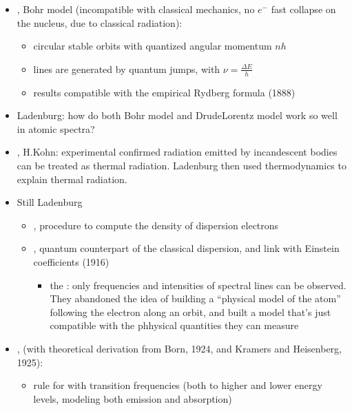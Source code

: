 \documentclass[letterpaper,10pt,english]{jupyterBook}
\begin{document}
\begin{itemize}
\begin{itemize}
\item {} 
, Bohr model (incompatible with classical mechanics, no \(e^-\) fast collapse on the nucleus, due to classical radiation):
\begin{itemize}
\item {} 
\sphinxAtStartPar
circular stable orbits with quantized angular momentum \(n h\)

\item {} 
\sphinxAtStartPar
lines are generated by quantum jumps, with \(\nu = \frac{\Delta E}{h}\)

\item {} 
\sphinxAtStartPar
results compatible with the empirical Rydberg formula (1888)

\end{itemize}

\item {} 
\sphinxAtStartPar
Ladenburg: how do both Bohr model and Drude\sphinxhyphen{}Lorentz model work so well in atomic spectra?

\item {} 
, H.Kohn: experimental confirmed radiation emitted by incandescent bodies can be treated as thermal radiation. Ladenburg then used thermodynamics to explain thermal radiation.

\item {} 
\sphinxAtStartPar
Still Ladenburg
\begin{itemize}
\item {} 
, procedure to compute the density of dispersion electrons

\item {} 
, quantum counterpart of the classical dispersion, and link with Einstein coefficients (1916)
\begin{itemize}
\item {} 
\sphinxAtStartPar
the : only frequencies and intensities of spectral lines can be observed. They abandoned the idea of building a “physical model of the atom” following the electron along an orbit, and built a model that’s just compatible with the phhysical quantities they can measure

\end{itemize}

\end{itemize}

\item {} 
,  (with theoretical derivation from Born, 1924, and Kramers and Heisenberg, 1925):
\begin{itemize}
\item {} 
\sphinxAtStartPar
rule for  with transition frequencies (both to higher and lower energy levels, modeling both emission and absorption)


\end{itemize}
\end{itemize}
\end{itemize}
\end{document}
